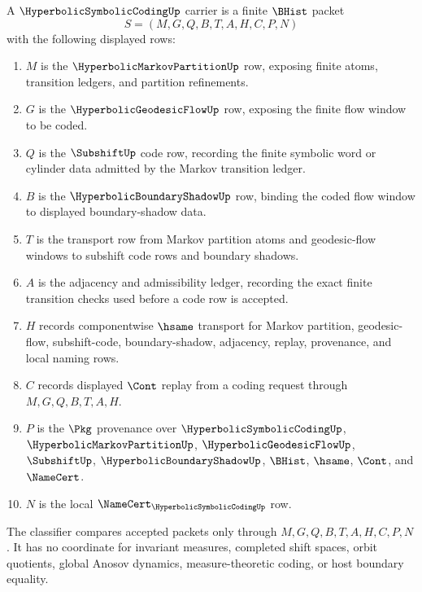 \begin{definition}
\label{def:hyperbolic-symbolic-coding-carrier}
A $\HyperbolicSymbolicCodingUp$ carrier is a finite $\BHist$ packet
$$
S=(M,G,Q,B,T,A,H,C,P,N)
$$
with the following displayed rows:
\begin{enumerate}
\item $M$ is the $\HyperbolicMarkovPartitionUp$ row, exposing finite atoms, transition ledgers, and partition refinements.
\item $G$ is the $\HyperbolicGeodesicFlowUp$ row, exposing the finite flow window to be coded.
\item $Q$ is the $\SubshiftUp$ code row, recording the finite symbolic word or cylinder data admitted by the Markov transition ledger.
\item $B$ is the $\HyperbolicBoundaryShadowUp$ row, binding the coded flow window to displayed boundary-shadow data.
\item $T$ is the transport row from Markov partition atoms and geodesic-flow windows to subshift code rows and boundary shadows.
\item $A$ is the adjacency and admissibility ledger, recording the exact finite transition checks used before a code row is accepted.
\item $H$ records componentwise $\hsame$ transport for Markov partition, geodesic-flow, subshift-code, boundary-shadow, adjacency, replay, provenance, and local naming rows.
\item $C$ records displayed $\Cont$ replay from a coding request through $M,G,Q,B,T,A,H$.
\item $P$ is the $\Pkg$ provenance over $\HyperbolicSymbolicCodingUp$, $\HyperbolicMarkovPartitionUp$, $\HyperbolicGeodesicFlowUp$, $\SubshiftUp$, $\HyperbolicBoundaryShadowUp$, $\BHist$, $\hsame$, $\Cont$, and $\NameCert$.
\item $N$ is the local $\NameCert_{\HyperbolicSymbolicCodingUp}$ row.
\end{enumerate}
The classifier compares accepted packets only through $M,G,Q,B,T,A,H,C,P,N$. It has no coordinate for invariant measures, completed shift spaces, orbit quotients, global Anosov dynamics, measure-theoretic coding, or host boundary equality.
\end{definition}

